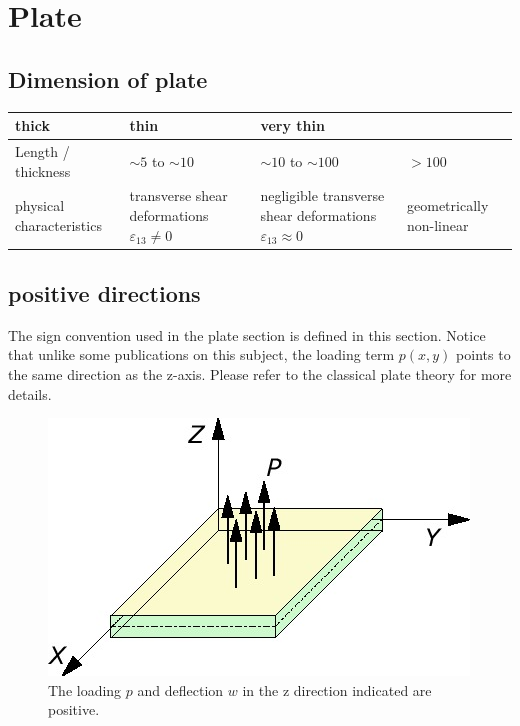 
\chapter{Plate}

\section{Dimension of plate}
% 
\begin{table}[h]
\begin{tabular}{|p{3.5cm}|p{3.5cm}|p{3.5cm}|p{3.5cm}|}
\hline
thick & thin & very thin \\ 
\hline
Length / thickness & $ \sim 5 $ to $ \sim 10 $ & $ \sim 10 $ to $ \sim 100 $ & $ > 100 $ \\ 
\hline
physical characteristics & transverse shear deformations $ \varepsilon_{13} \neq 0 $ & negligible transverse shear deformations $ \varepsilon_{13} \approx 0 $ & geometrically non-linear \\ 
\hline 
\end{tabular} 
\end{table}

\section{positive directions}
The sign convention used in the plate section is defined in this section.
Notice that unlike some publications on this subject, the loading term $ p(x,y) $ points to the same direction as the z-axis.
Please refer to the classical plate theory for more details.

\begin{figure}[h!]
\centering
\includegraphics[width=0.6\linewidth]{figures/plate_force_positive_direction}
\caption{The loading $ p $ and deflection $ w $ in the z direction indicated are positive.}
\label{fig:plate_force_positive_direction}
\end{figure}

